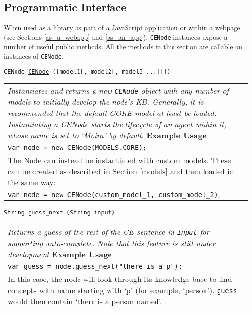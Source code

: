 \documentclass{scrartcl}
\begin{document}
\subsection{Programmatic Interface}
When used as a library as part of a JavaScript application or within a webpage (see Sections \ref{as_a_webapp} and \ref{as_an_app}), \texttt{CENode} instances expose a number of useful public methods. All the methods in this section are callable on instances of \texttt{CENode}.

\newcommand{\cenodemethod}[5]{
    \begin{flushleft}
    \begin{minipage}{1.2\textwidth}
    \vskip10pt
    \begin{large}
        \noindent\texttt{#1 \underline{#2} (#3)}
    \end{large}
    \vskip5pt
    \begin{tabular}{|p{0.9\textwidth}}
        \textit{#4}
        \vskip8pt
        \textbf{Example Usage}\\
        #5
    \end{tabular}
    \end{minipage}
    \end{flushleft}
}

\cenodemethod{CENode}{CENode}{[model1[, model2[, model3 ...]]]}{Instantiates and returns a new \texttt{CENode} object with any number of models to initially develop the node's KB. Generally, it is recommended that the default CORE model at least be loaded. Instantiating a CENode starts the lifecycle of an agent within it, whose name is set to `Moira' by default.}{
    \texttt{var node = new CENode(MODELS.CORE);}\\
    The Node can instead be instantiated with custom models. These can be created as described in Section \ref{models} and then loaded in the same way:\\
    \texttt{var node = new CENode(custom\_model\_1, custom\_model\_2);}
}

\cenodemethod{String}{guess\_next}{String input}{Returns a guess of the rest of the CE sentence in \texttt{input} for supporting auto-complete. Note that this feature is still under development}{
    \texttt{var guess = node.guess\_next("there is a p");}\\
    In this case, the node will look through its knowledge base to find concepts with name starting with `p' (for example, `person'). \texttt{guess} would then contain `there is a person named'.
}
\end{document}
